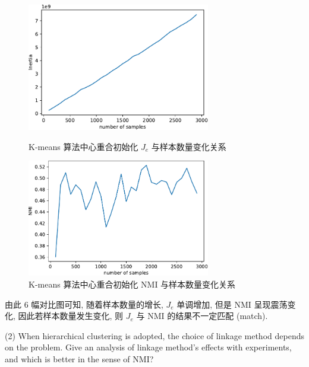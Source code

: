 \documentclass[openany]{ctexbook}
\theoremstyle{kaiti}
\theoremstyle{normal}
\begin{document}
\begin{figure}[htbp]
  \centering
  \begin{minipage}[t]{0.48\textwidth}
    \centering
    \includegraphics[width=8cm]{kmeans_innertia_coincide.pdf}
    \caption{K-means 算法中心重合初始化 $J_e$ 与样本数量变化关系}
    \label{fig:kmeans_innertia_coincide}
  \end{minipage}
  \begin{minipage}[t]{0.48\textwidth}
    \centering
    \includegraphics[width=8cm]{kmeans_nmi_coincide.pdf}
    \caption{K-means 算法中心重合初始化 NMI 与样本数量变化关系}
    \label{fig:kmeans_nmi_coincide}
  \end{minipage}
\end{figure}

由此 6 幅对比图可知, 随着样本数量的增长, $J_e$ 单调增加, 但是 NMI 呈现震荡变化, 因此若样本数量发生变化, 则 $J_e$ 与 NMI 的结果不一定匹配 (match).

(2) When hierarchical clustering is adopted, the choice of linkage method depends on the problem. Give an analysis of linkage method's effects with experiments, and which is better in the sense of NMI?
\end{document}
